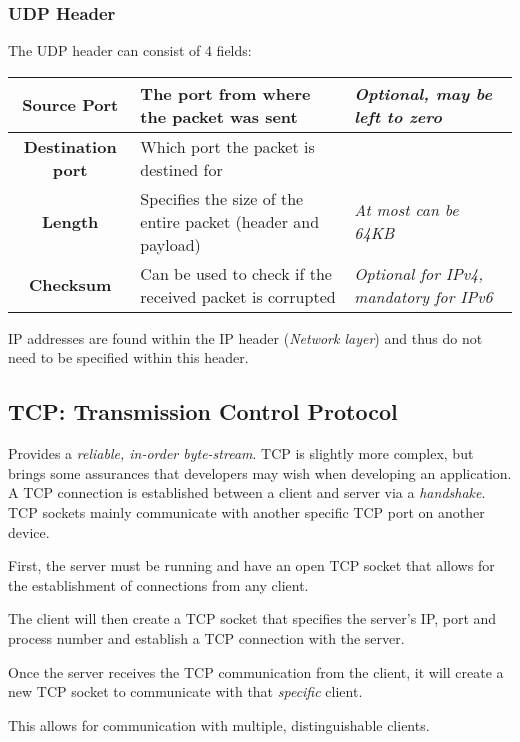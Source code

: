 \documentclass{article}
\begin{document}
\subsubsection{UDP Header}

The UDP header can consist of 4 fields:

\begin{center}
  \begin{tabular}{|c|p{4cm}|p{3.5cm}|}
    \hline
    \textbf{Source Port} & The port from where the packet was sent & \textit{Optional, may be left to zero}\\
    \hline
    \textbf{Destination port} & Which port the packet is destined for & \\
    \hline
    \textbf{Length} & Specifies the size of the entire packet (header and payload) & \textit{At most can be 64KB}\\
    \hline
    \textbf{Checksum} & Can be used to check if the received packet is corrupted & \textit{Optional for IPv4, mandatory for IPv6}\\
    \hline
  \end{tabular}
\end{center}

IP addresses are found within the IP header (\textit{Network layer}) and thus do not need to be specified within this header.

\subsection{TCP: Transmission Control Protocol}

Provides a \textit{reliable, in-order byte-stream}. TCP is slightly more complex, but brings some assurances that developers may wish when developing an application. A TCP connection is established between a client and server via a \textit{handshake}. TCP sockets mainly communicate with another specific TCP port on another device.

First, the server must be running and have an open TCP socket that allows for the establishment of connections from any client. 

The client will then create a TCP socket that specifies the server's IP, port and process number and establish a TCP connection with the server.

Once the server receives the TCP communication from the client, it will create a new TCP socket to communicate with that \textit{specific} client.

This allows for communication with multiple, distinguishable clients.
\filbreak
\end{document}
